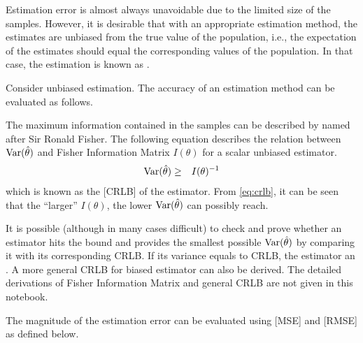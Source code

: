 Estimation error is almost always unavoidable due to the limited size of the samples. However, it is desirable that with an appropriate estimation method, the estimates are unbiased from the true value of the population, i.e., the expectation of the estimates should equal the corresponding values of the population. In that case, the estimation is known as . 

Consider unbiased estimation. The accuracy of an estimation method can be evaluated as follows.

The maximum information contained in the samples can be described by  named after Sir Ronald Fisher. The following equation describes the relation between $\textup{Var}(\hat{\theta})$ and Fisher Information Matrix $I(\theta)$ for a scalar unbiased estimator.
\begin{eqnarray}
	\textup{Var}(\hat{\theta}) &\geq& I(\theta)^{-1} \label{eq:crlb}
\end{eqnarray}
which is known as the [CRLB] of the estimator. From \eqref{eq:crlb}, it can be seen that the ``larger'' $I(\theta)$, the lower $\textup{Var}(\hat{\theta})$  can possibly reach.

It is possible (although in many cases difficult) to check and prove whether an estimator hits the bound and provides the smallest possible $\textup{Var}(\hat{\theta})$ by comparing it with its corresponding CRLB. If its variance equals to CRLB, the estimator an . A more general CRLB for biased estimator can also be derived. The detailed derivations of Fisher Information Matrix and general CRLB are not given in this notebook.

The magnitude of the estimation error can be evaluated using [MSE] and [RMSE] as defined below. 

